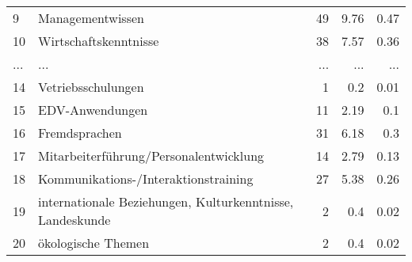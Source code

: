 \begin{longtable}{lXrrr}
        9 & \multicolumn{1}{X}{Managementwissen} & %
          \num{49} &
          \num[round-mode=places,round-precision=2]{9,76} &
          \num[round-mode=places,round-precision=2]{0,47} \\
        10 & \multicolumn{1}{X}{Wirtschaftskenntnisse} & %
          \num{38} &
          \num[round-mode=places,round-precision=2]{7,57} &
          \num[round-mode=places,round-precision=2]{0,36} \\
       ... & ... & ... & ... & ... \\
        14 & \multicolumn{1}{X}{Vetriebsschulungen} & %
          \num{1} &
          \num[round-mode=places,round-precision=2]{0,2} &
          \num[round-mode=places,round-precision=2]{0,01} \\

        15 & \multicolumn{1}{X}{EDV-Anwendungen} & %
          \num{11} &
          \num[round-mode=places,round-precision=2]{2,19} &
          \num[round-mode=places,round-precision=2]{0,1} \\

        16 & \multicolumn{1}{X}{Fremdsprachen} & %
          \num{31} &
          \num[round-mode=places,round-precision=2]{6,18} &
          \num[round-mode=places,round-precision=2]{0,3} \\

        17 & \multicolumn{1}{X}{Mitarbeiterführung/Personalentwicklung} & %
          \num{14} &
          \num[round-mode=places,round-precision=2]{2,79} &
          \num[round-mode=places,round-precision=2]{0,13} \\

        18 & \multicolumn{1}{X}{Kommunikations-/Interaktionstraining} & %
          \num{27} &
          \num[round-mode=places,round-precision=2]{5,38} &
          \num[round-mode=places,round-precision=2]{0,26} \\

        19 & \multicolumn{1}{X}{internationale Beziehungen, Kulturkenntnisse, Landeskunde} & %
          \num{2} &
          \num[round-mode=places,round-precision=2]{0,4} &
          \num[round-mode=places,round-precision=2]{0,02} \\

        20 & \multicolumn{1}{X}{ökologische Themen} & %
          \num{2} &
          \num[round-mode=places,round-precision=2]{0,4} &
          \num[round-mode=places,round-precision=2]{0,02} \\


\end{longtable}
